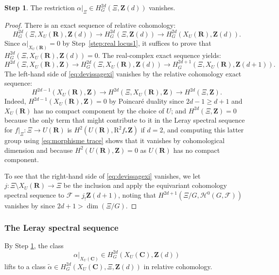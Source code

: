 \documentclass[JEP,XML,SOM,Unicode]{cedram}
\theoremstyle{plain}
\theoremstyle{definition}
\newtheorem{Step}{Step}
\numberwithin{equation}{section}
\newcommand{\sH}{{\mathscr H}}
\newcommand{\sF}{{\mathscr F}}
\renewcommand{\C}{{\mathbf C}}
\newcommand{\R}{{\mathbf R}}
\newcommand{\Z}{{\mathbf Z}}
\newcommand{\RR}{{\mathrm{R}}}
\begin{document}
\begin{Step}
\label{step:real locus2}
The restriction $\alpha|_{\Xi}\in H^{2d}_G(\Xi,\Z(d))$ vanishes.
\end{Step}

\begin{proof}
There is an exact sequence of relative cohomology:
\[
H^{2d}_G(\Xi, X_U(\R),\Z(d))\to H^{2d}_G(\Xi,\Z(d))\to H^{2d}_G(X_U(\R),\Z(d)).
\]
Since $\alpha|_{X_U(\R)}=0$ by Step~\ref{step:real locus1}, it suffices to prove that $H^{2d}_G(\Xi, X_U(\R),\Z(d))=0$.
The real-complex exact sequence \cite[(\ref*{BW1-eq:real-complex long 01})]{BW1} yields:
\begin{equation}
\label{eq:devissagexi}
H^{2d}(\Xi, X_U(\R),\Z)\to H^{2d}_G(\Xi, X_U(\R),\Z(d))\to H^{2d+1}_G(\Xi, X_U(\R),\Z(d+1)).
\end{equation}
The left-hand side of \eqref{eq:devissagexi} vanishes by the relative cohomology exact sequence:
\[
H^{2d-1}(X_U(\R),\Z)\to H^{2d}(\Xi, X_U(\R),\Z)\to H^{2d}(\Xi,\Z).
\]
Indeed, $H^{2d-1}(X_U(\R),\Z)=0$ by Poincaré duality since $2d-1\geq d+1$ and $X_U(\R)$ has no compact component
by the choice of $U$;
and $H^{2d}(\Xi,\Z)=0$ because the only term that might contribute to it in the Leray spectral sequence for $f|_{\Xi}:\Xi\to U(\R)$ is $H^2(U(\R),\RR^2f_*\Z)$ if $d=2$, and computing this latter group using \eqref{eq:morphisme trace} shows that it vanishes by cohomological dimension \cite[Ch.\,II, Lem.\,9.1]{delfshomology} and because $H^2(U(\R),\Z)=0$ as $U(\R)$ has no compact component.

To see that the right-hand side of \eqref{eq:devissagexi} vanishes, we let $j:\Xi\setminus X_U(\R)\to \Xi$ be the inclusion and apply the equivariant cohomology spectral sequence \cite[(\ref*{BW1-eq:first spectral sequence})]{BW1} to $\sF=j_!\Z(d+1)$, noting that $H^{2d+1}(\Xi/G,\sH^0(G,\sF))$ vanishes by \cite[\emph{loc.\,cit.}]{delfshomology} since $2d+1>\dim(\Xi/G)$.
\end{proof}

\subsubsection{The Leray spectral sequence}
\label{subsubsec:Leray}

By Step \ref{step:real locus2}, the class
\[
\alpha|_{X_U(\C)}\in H^{2d}_G(X_U(\C),\Z(d))
\]
lifts to a class $\tilde{\alpha}\in H^{2d}_G(X_U(\C),\Xi,\Z(d))$ in relative cohomology.
\end{document}
